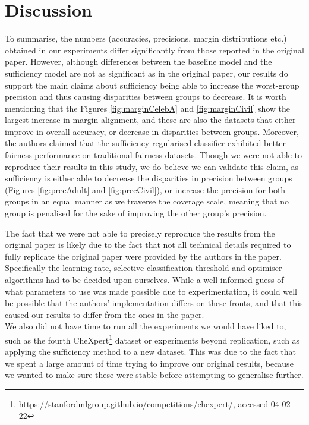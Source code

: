\section{Discussion}
To summarise, the numbers (accuracies, precisions, margin distributions etc.) obtained in our experiments differ significantly from those reported in the original paper. However, although differences between the baseline model and the sufficiency model are not as significant as in the original paper, our results do support the main claims about sufficiency being able to increase the worst-group precision and thus causing disparities between groups to decrease. It is worth mentioning that the Figures \ref{fig:marginCelebA} and \ref{fig:marginCivil} show the largest increase in margin alignment, and these are also the datasets that either improve in overall accuracy, or decrease in disparities between groups. Moreover, the authors claimed that the sufficiency-regularised classifier exhibited better fairness performance on traditional fairness datasets. Though we were not able to reproduce their results in this study, we do believe we can validate this claim, as sufficiency is either able to decrease the disparities in precision between groups (Figures \ref{fig:precAdult} and \ref{fig:precCivil}), or increase the precision for both groups in an equal manner as we traverse the coverage scale, meaning that no group is penalised for the sake of improving the other group's precision.

The fact that we were not able to precisely reproduce the results from the original paper is likely due to the fact that not all technical details required to fully replicate the original paper were provided by the authors in the paper. Specifically the learning rate, selective classification threshold and optimiser algorithms had to be decided upon ourselves. While a well-informed guess of what parameters to use was made possible due to experimentation, it could well be possible that the authors' implementation differs on these fronts, and that this caused our results to differ from the ones in the paper. \\ 
We also did not have time to run all the experiments we would have liked to, such as the fourth CheXpert\footnote{\url{https://stanfordmlgroup.github.io/competitions/chexpert/}, accessed 04-02-22} dataset or experiments beyond replication, such as applying the sufficiency method to a new dataset. This was due to the fact that we spent a large amount of time trying to improve our original results, because we wanted to make sure these were stable before attempting to generalise further.

